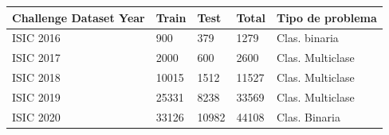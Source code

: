 \begin{table}[H]
	\centering
	\begin{tabular}{|l|l|l|l|l|}
		\hline
		\textbf{Challenge Dataset Year} & \textbf{Train} & \textbf{Test} & \textbf{Total} & \textbf{Tipo de problema } \\ \hline
		ISIC 2016 & 900 & 379 & 1279 & Clas. binaria  \\ \hline
		ISIC 2017 & 2000 & 600 & 2600 & Clas. Multiclase  \\ \hline
		ISIC 2018 & 10015 & 1512 & 11527 & Clas. Multiclase  \\ \hline
		ISIC 2019 & 25331 & 8238 & 33569 & Clas. Multiclase  \\ \hline
		ISIC 2020 & 33126 & 10982 & 44108 & Clas. Binaria  \\ \hline
	\end{tabular}
\end{table}

